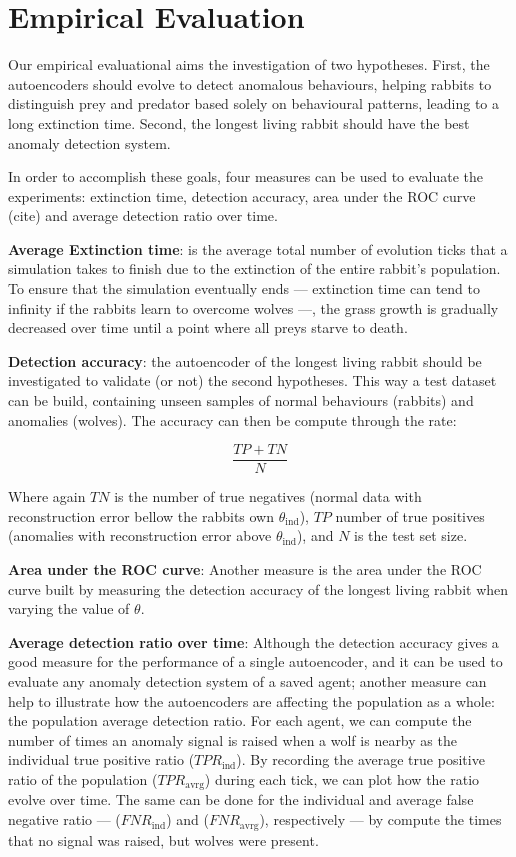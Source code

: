 \documentclass[letterpaper]{article}
\numberwithin{equation}{section}
\numberwithin{theorem}{section}
\numberwithin{lemma}{section}
\numberwithin{df}{section}
\begin{document}
\section{Empirical Evaluation}

Our empirical evaluational aims the investigation of two hypotheses. First, the autoencoders should evolve to detect anomalous behaviours, helping rabbits to distinguish prey and predator based solely on behavioural patterns, leading to a long extinction time. Second, the longest living rabbit should have the best anomaly detection system. 
 
In order to accomplish these goals, four measures can be used to evaluate the experiments: extinction time, detection accuracy, area under the ROC curve (cite) and average detection ratio over time.

\textbf{Average Extinction time}: is the average total number of evolution ticks that a simulation takes to finish due to the extinction of the entire rabbit's population. To ensure that the simulation eventually ends --- extinction time can tend to infinity if the rabbits learn to overcome wolves ---, the grass growth is gradually decreased over time until a point where all preys starve to death.

\textbf{Detection accuracy}: the autoencoder of the longest living rabbit should be investigated to validate (or not) the second hypotheses. This way a test dataset can be build, containing unseen samples of normal behaviours (rabbits) and anomalies (wolves). The accuracy can then be compute through the rate:

\[\frac{TP+TN}{N}\]
 
Where again $TN$ is the number of true negatives (normal data with reconstruction error bellow the rabbits own $\theta_\text{ind}$), $TP$ number of true positives (anomalies with reconstruction error above $\theta_\text{ind}$), and $N$ is the test set size.

\textbf{Area under the ROC curve}: Another measure is the area under the ROC curve built by measuring the detection accuracy of the longest living rabbit when varying the value of $\theta$.

\textbf{Average detection ratio over time}: Although the detection accuracy gives a good measure for the performance of a single autoencoder, and it can be used to evaluate any anomaly detection system of a saved agent; another measure can help to illustrate how the autoencoders are affecting the population as a whole: the population average detection ratio. For each agent, we can compute the number of times an anomaly signal is raised when a wolf is nearby as the individual true positive ratio ($TPR_{\text{ind}}$). By recording the average true positive ratio of the population ($TPR_{\text{avrg}}$) during each tick, we can plot how the ratio evolve over time. The same can be done for the individual and average false negative ratio --- ($FNR_{\text{ind}}$) and ($FNR_{\text{avrg}}$), respectively --- by compute the times that no signal was raised, but wolves were present.
\end{document}
